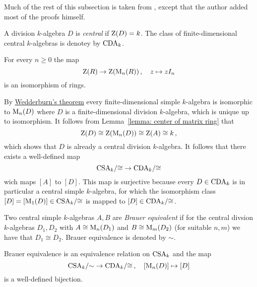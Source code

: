 \begin{fluff}
  Much of the rest of this subsection is taken from \cite[4.2]{Clark2012NonCA}, except that the author added most of the proofs himself.
\end{fluff}


\begin{definition}
  A division $k$-algebra $D$ is \emph{central} if $\operatorname{Z}(D) = k$.
  The class of finite-dimensional central $k$-algebras is denotey by $\operatorname{CDA}_k$.
\end{definition}


\begin{lemma}
  \label{lemma: center of matrix ring}
  For every $n \geq 0$ the map
  \[
            \operatorname{Z}(R)
    \to     \operatorname{Z}(\operatorname{M}_n(R))  \,,
    \quad   z
    \mapsto z I_n
  \]
  is an isomorphism of rings.
\end{lemma}


\begin{fluff}
  By \hyperref[theorem: wedderburns theorem]{Wedderburn’s theorem} every finite-dimensional simple $k$-algebra is isomorphic to $\operatorname{M}_n(D)$ where $D$ is a finite-dimensional division $k$-algebra, which is unique up to isomorphism.
  It follows from Lemma~\ref{lemma: center of matrix ring} that
  \[
          \operatorname{Z}(D)
    \cong \operatorname{Z}(\operatorname{M}_n(D))
    \cong \operatorname{Z}(A)
    \cong k \,,
  \]
  which shows that $D$ is already a central division $k$-algebra.
  It follows that there exists a well-defined map
  \[
        \operatorname{CSA}_k\!/{\cong}
    \to \operatorname{CDA}_k\!/{\cong}
  \]
  wich maps $[A]$ to $[D]$.
  This map is surjective because every $D \in \operatorname{CDA}_k$ is in particular a central simple $k$-algebra, for which the isomorphism class $[D] = [\operatorname{M}_1(D)] \in \operatorname{CSA}_k\!/{\cong}$ is mapped to $[D] \in \operatorname{CDA}_k\!/{\cong}$.
\end{fluff}


\begin{definition}
  Two central simple $k$-algebras $A, B$ are \emph{Brauer equivalent} if for the central divsion $k$-algebras $D_1, D_2$ with $A \cong \operatorname{M}_n(D_1)$ and $B \cong \operatorname{M}_m(D_2)$ (for suitable $n, m$) we have that $D_1 \cong D_2$.
  Brauer equivalence is denoted by $\sim$.
\end{definition}


\begin{corollary}
  Brauer equivalence is an equivalence relation on $\operatorname{CSA}_k$ and the map
  \[
        \operatorname{CSA}_k\!/{\sim}
    \to \operatorname{CDA}_k\!/{\cong} \,,
    \quad   [\operatorname{M}_n(D)]
    \mapsto [D]
  \]
  is a well-defined bijection.
\end{corollary}


